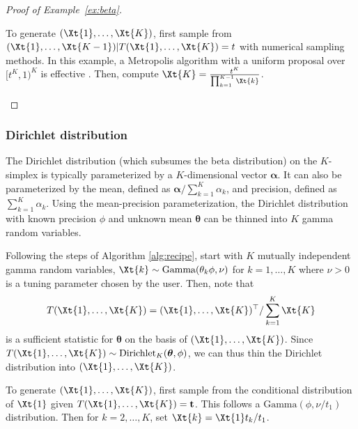 \documentclass[12pt]{article}
\begin{document}
\begin{proof}[Proof of Example~\ref{ex:beta}]
\begin{enumerate}
To generate $(\Xt{1},\dots,\Xt{K})$, first sample from $(\Xt{1},\dots,\Xt{K-1})|T(\Xt{1},\dots,\Xt{K})=t$ with numerical sampling methods. In this example, a Metropolis algorithm with a uniform proposal over $[t^{K},1)^K$ is effective \citep{metropolis1953equation}. Then, compute $\Xt{K}=\frac{t^K}{\prod_{k=1}^{K-1}\Xt{k}}$. 
\end{enumerate}
\end{proof}

\subsubsection{Dirichlet distribution}
\label{subsec:dirichlet}

The Dirichlet distribution (which subsumes the beta distribution) on the $K$-simplex is typically parameterized by a $K$-dimensional vector $\boldsymbol\alpha$. It can also be parameterized by the mean, defined as $\boldsymbol\alpha/\sum_{k=1}^K\alpha_k$, and precision, defined as $\sum_{k=1}^K \alpha_k$. Using the mean-precision parameterization, the Dirichlet distribution with known precision $\phi$ and unknown mean $\boldsymbol\theta$ can be thinned into $K$ gamma random variables.

\begin{exmp}
\label{ex:dirichlet}
Following the steps of Algorithm \ref{alg:recipe}, start with $K$ mutually independent gamma random variables, $\Xt{k}\sim\text{Gamma}(\theta_k\phi,\nu)$ for $k=1,\dots,K$ where $\nu>0$ is a tuning parameter chosen by the user. Then, note that   
$$
T(\Xt{1},\dots,\Xt{K}) = (\Xt{1},\dots,\Xt{K})^\top/\sum_{k=1}^K\Xt{K}
$$
is a sufficient statistic for $\boldsymbol\theta$ on the basis of $(\Xt{1},\dots,\Xt{K})$. Since $T(\Xt{1},\dots,\Xt{K}) \sim \text{Dirichlet}_K(\boldsymbol\theta,\phi)$, we can thus thin the Dirichlet distribution into $(\Xt{1},\dots,\Xt{K})$. 

To generate $(\Xt{1},\dots,\Xt{K})$, first sample from the conditional distribution of $\Xt{1}$ given $T(\Xt{1},\dots,\Xt{K})=\mathbf{t}$. This follows a $\text{Gamma}(\phi,\nu/t_1)$ distribution. Then for $k=2,\dots,K$, set $\Xt{k}=\Xt{1}t_k/t_1$.
\end{exmp}
\end{document}
